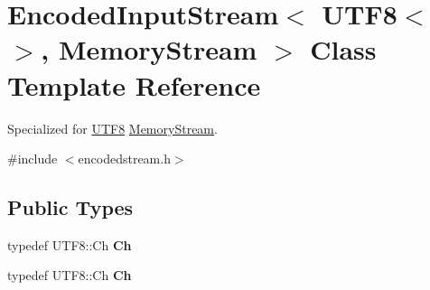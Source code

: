 \hypertarget{class_encoded_input_stream_3_01_u_t_f8_3_4_00_01_memory_stream_01_4}{}\section{Encoded\+Input\+Stream$<$ U\+T\+F8$<$$>$, Memory\+Stream $>$ Class Template Reference}
\label{class_encoded_input_stream_3_01_u_t_f8_3_4_00_01_memory_stream_01_4}


Specialized for \hyperlink{struct_u_t_f8}{U\+T\+F8} \hyperlink{struct_memory_stream}{Memory\+Stream}.  




{\ttfamily \#include $<$encodedstream.\+h$>$}

\subsection*{Public Types}
\begin{DoxyCompactItemize}
\item 
typedef U\+T\+F8\+::\+Ch {\bfseries Ch}\hypertarget{class_encoded_input_stream_3_01_u_t_f8_3_4_00_01_memory_stream_01_4_a091eb31dd2554bf10054148953f9b3bf}{}\label{class_encoded_input_stream_3_01_u_t_f8_3_4_00_01_memory_stream_01_4_a091eb31dd2554bf10054148953f9b3bf}

\item 
typedef U\+T\+F8\+::\+Ch {\bfseries Ch}\hypertarget{class_encoded_input_stream_3_01_u_t_f8_3_4_00_01_memory_stream_01_4_a091eb31dd2554bf10054148953f9b3bf}{}\label{class_encoded_input_stream_3_01_u_t_f8_3_4_00_01_memory_stream_01_4_a091eb31dd2554bf10054148953f9b3bf}

\end{DoxyCompactItemize}
